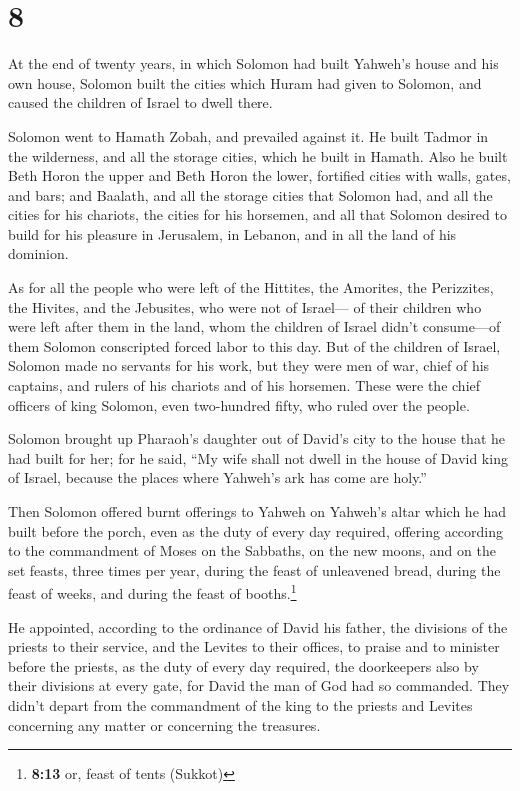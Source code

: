 \hypertarget{section-7}{%
\section{8}\label{section-7}}

 At the end of twenty years, in which Solomon had built
Yahweh's house and his own house,  Solomon built the
cities which Huram had given to Solomon, and caused the children of
Israel to dwell there.

 Solomon went to Hamath Zobah, and prevailed against it.
 He built Tadmor in the wilderness, and all the storage
cities, which he built in Hamath.  Also he built Beth
Horon the upper and Beth Horon the lower, fortified cities with walls,
gates, and bars;  and Baalath, and all the storage cities
that Solomon had, and all the cities for his chariots, the cities for
his horsemen, and all that Solomon desired to build for his pleasure in
Jerusalem, in Lebanon, and in all the land of his dominion.

 As for all the people who were left of the Hittites, the
Amorites, the Perizzites, the Hivites, and the Jebusites, who were not
of Israel---  of their children who were left after them
in the land, whom the children of Israel didn't consume---of them
Solomon conscripted forced labor to this day.  But of the
children of Israel, Solomon made no servants for his work, but they were
men of war, chief of his captains, and rulers of his chariots and of his
horsemen.  These were the chief officers of king Solomon,
even two-hundred fifty, who ruled over the people.

 Solomon brought up Pharaoh's daughter out of David's
city to the house that he had built for her; for he said, ``My wife
shall not dwell in the house of David king of Israel, because the places
where Yahweh's ark has come are holy.''

 Then Solomon offered burnt offerings to Yahweh on
Yahweh's altar which he had built before the porch,  even
as the duty of every day required, offering according to the commandment
of Moses on the Sabbaths, on the new moons, and on the set feasts, three
times per year, during the feast of unleavened bread, during the feast
of weeks, and during the feast of booths.\footnote{\textbf{8:13} or,
  feast of tents (Sukkot)}

 He appointed, according to the ordinance of David his
father, the divisions of the priests to their service, and the Levites
to their offices, to praise and to minister before the priests, as the
duty of every day required, the doorkeepers also by their divisions at
every gate, for David the man of God had so commanded. 
They didn't depart from the commandment of the king to the priests and
Levites concerning any matter or concerning the treasures.


